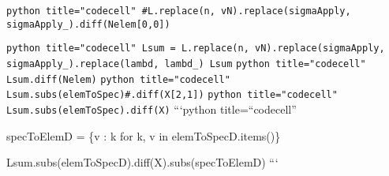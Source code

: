 \documentclass[
]{article}
\begin{document}
\texttt{python title="codecell" #L.replace(n, vN).replace(sigmaApply, sigmaApply_).diff(Nelem[0,0])}

\texttt{python title="codecell" Lsum = L.replace(n, vN).replace(sigmaApply, sigmaApply_).replace(lambd, lambd_) Lsum}
\texttt{python title="codecell" Lsum.diff(Nelem)}
\texttt{python title="codecell" Lsum.subs(elemToSpec)#.diff(X[2,1])}
\texttt{python title="codecell" Lsum.subs(elemToSpec).diff(X)}
```python title=``codecell''

specToElemD = \{v : k for k, v in elemToSpecD.items()\}

Lsum.subs(elemToSpecD).diff(X).subs(specToElemD) ```
\end{document}
